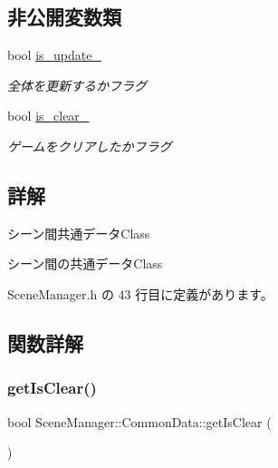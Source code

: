 \subsection*{非公開変数類}
\begin{DoxyCompactItemize}
\item 
bool \mbox{\hyperlink{class_scene_manager_1_1_common_data_a20614bc0af84ec92a4c3a564c0345f9e}{is\+\_\+update\+\_\+}}
\begin{DoxyCompactList}\small\item\em 全体を更新するかフラグ \end{DoxyCompactList}\item 
bool \mbox{\hyperlink{class_scene_manager_1_1_common_data_a467635269880aaf0e5983389cc2ca657}{is\+\_\+clear\+\_\+}}
\begin{DoxyCompactList}\small\item\em ゲームをクリアしたかフラグ \end{DoxyCompactList}\end{DoxyCompactItemize}


\subsection{詳解}
シーン間共通データ\+Class 

シーン間の共通データ\+Class 

 Scene\+Manager.\+h の 43 行目に定義があります。



\subsection{関数詳解}
\mbox{\label{class_scene_manager_1_1_common_data_a88aa3cc8dd3de9d2e10dc947ca06d397}} 
\subsubsection{\texorpdfstring{get\+Is\+Clear()}{getIsClear()}}
{\footnotesize\ttfamily bool Scene\+Manager\+::\+Common\+Data\+::get\+Is\+Clear (\begin{DoxyParamCaption}{ }\end{DoxyParamCaption})}




